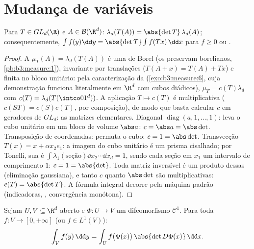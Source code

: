 \section{Mudança de variáveis}

\begin{theorem}
\label{thm:b3:product:linearchange}
Para $T \in GL_d(\R)$ e $A \in \mathcal B(\R^d)$: $\lambda_d(T(A)) = \abs{\det T}\,\lambda_d(A)$; consequentemente, $\int f(y)\dd y = \abs{\det T}\int f(Tx)\,\dd x$ para $f \geq 0$ ou
.
\end{theorem}

\begin{proof}
A  $\mu_T(A) = \lambda_d(T(A))$ é uma  de Borel (os  preservam
borelianos, \cref{pb:b3:measure:1}), invariante por translações ($T(A + x) = T(A) + Tx$) e finita
no bloco unitário: pela caracterização da 
(\cref{exo:b3:measure:6}, cuja demonstração funciona literalmente em $\R^d$
com cubos diádicos), $\mu_T = c(T)\lambda_d$ com $c(T)
= \lambda_d(T(\intco01^d))$. A aplicação $T \mapsto c(T)$ é multiplicativa
($c(ST) = c(S)c(T)$, por composição), de modo que basta calcular $c$ em geradores
de $GL_d$: as matrizes elementares. Diagonal $\operatorname{diag}(a, 1, \dots, 1)$: leva o cubo
unitário em um bloco de volume $\abs a$: $c = \abs a =
\abs\det$. Transposição de
coordenadas: permuta o cubo: $c
= 1 = \abs\det$. Transvecção $T(x) = x + \alpha
x_2e_1$: a imagem do cubo
unitário é um prisma cisalhado; por Tonelli, sua  é $\int\lambda_1(\text{seção})\dd x_2
\cdots \dd x_d = 1$, sendo
cada seção em $x_1$ um intervalo de comprimento $1$: $c = 1 = \abs{\det}$. Toda
matriz inversível é um produto dessas (eliminação gaussiana), e tanto
$c$ quanto $\abs\det$ são multiplicativas: $c(T) = \abs{\det T}$. A fórmula integral
decorre pela máquina padrão (indicadoras, , convergência
monótona).
\end{proof}

\begin{theorem}\label{thm:b3:product:changeofvar}
Sejam $U, V \subseteq \R^d$ aberto e $\Phi \colon U \to V$ um difeomorfismo $\mathcal C^1$. Para toda  $f \colon V
\to [0, +\infty]$ (ou $f \in L^1(V)$):
\[
\int_V f(y)\,\dd y = \int_U
f\bigl(\Phi(x)\bigr)\,\abs{\det D\Phi(x)}\,\dd x .
\]
\end{theorem}

